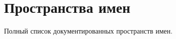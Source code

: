 \section{Пространства имен}
Полный список документированных пространств имен.\begin{CompactList}
\item{}
\item{}
\end{CompactList}
